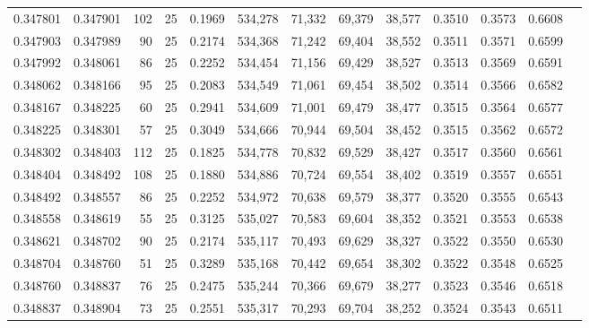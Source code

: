 \begin{tabular}{rrrrrrrrrrrrr}
0.347801 & 0.347901 &   102 &  25 &                                     0.1969 & 534,278 &  71,332 &  69,379 &  38,577 & 0.3510 & 0.3573 & 0.6608 \\
0.347903 & 0.347989 &    90 &  25 &                                     0.2174 & 534,368 &  71,242 &  69,404 &  38,552 & 0.3511 & 0.3571 & 0.6599 \\
0.347992 & 0.348061 &    86 &  25 &                                     0.2252 & 534,454 &  71,156 &  69,429 &  38,527 & 0.3513 & 0.3569 & 0.6591 \\
0.348062 & 0.348166 &    95 &  25 &                                     0.2083 & 534,549 &  71,061 &  69,454 &  38,502 & 0.3514 & 0.3566 & 0.6582 \\
0.348167 & 0.348225 &    60 &  25 &                                     0.2941 & 534,609 &  71,001 &  69,479 &  38,477 & 0.3515 & 0.3564 & 0.6577 \\
0.348225 & 0.348301 &    57 &  25 &                                     0.3049 & 534,666 &  70,944 &  69,504 &  38,452 & 0.3515 & 0.3562 & 0.6572 \\
0.348302 & 0.348403 &   112 &  25 &                                     0.1825 & 534,778 &  70,832 &  69,529 &  38,427 & 0.3517 & 0.3560 & 0.6561 \\
0.348404 & 0.348492 &   108 &  25 &                                     0.1880 & 534,886 &  70,724 &  69,554 &  38,402 & 0.3519 & 0.3557 & 0.6551 \\
0.348492 & 0.348557 &    86 &  25 &                                     0.2252 & 534,972 &  70,638 &  69,579 &  38,377 & 0.3520 & 0.3555 & 0.6543 \\
0.348558 & 0.348619 &    55 &  25 &                                     0.3125 & 535,027 &  70,583 &  69,604 &  38,352 & 0.3521 & 0.3553 & 0.6538 \\
0.348621 & 0.348702 &    90 &  25 &                                     0.2174 & 535,117 &  70,493 &  69,629 &  38,327 & 0.3522 & 0.3550 & 0.6530 \\
0.348704 & 0.348760 &    51 &  25 &                                     0.3289 & 535,168 &  70,442 &  69,654 &  38,302 & 0.3522 & 0.3548 & 0.6525 \\
0.348760 & 0.348837 &    76 &  25 &                                     0.2475 & 535,244 &  70,366 &  69,679 &  38,277 & 0.3523 & 0.3546 & 0.6518 \\
0.348837 & 0.348904 &    73 &  25 &                                     0.2551 & 535,317 &  70,293 &  69,704 &  38,252 & 0.3524 & 0.3543 & 0.6511 \\

\end{tabular}
